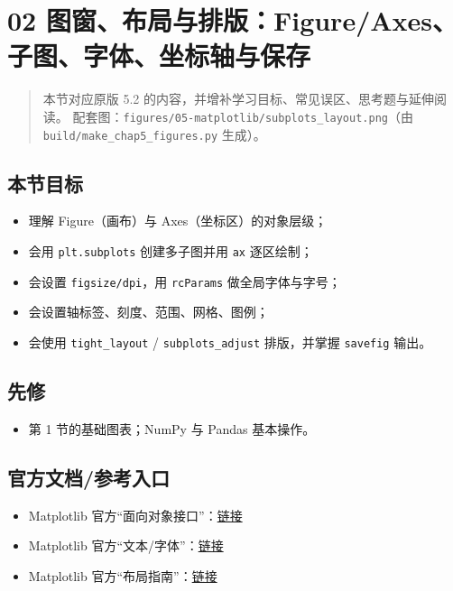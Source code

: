 \section{02
图窗、布局与排版：Figure/Axes、子图、字体、坐标轴与保存}\label{ux56feux7a97ux5e03ux5c40ux4e0eux6392ux7248figureaxesux5b50ux56feux5b57ux4f53ux5750ux6807ux8f74ux4e0eux4fddux5b58}

\begin{quote}
本节对应原版 5.2 的内容，并增补学习目标、常见误区、思考题与延伸阅读。
配套图：\texttt{figures/05-matplotlib/subplots\_layout.png}（由
\texttt{build/make\_chap5\_figures.py} 生成）。
\end{quote}

\subsection{本节目标}\label{ux672cux8282ux76eeux6807-21}

\begin{itemize}
\tightlist
\item
  理解 Figure（画布）与 Axes（坐标区）的对象层级；
\item
  会用 \texttt{plt.subplots} 创建多子图并用 \texttt{ax} 逐区绘制；
\item
  会设置 \texttt{figsize/dpi}，用 \texttt{rcParams} 做全局字体与字号；
\item
  会设置轴标签、刻度、范围、网格、图例；
\item
  会使用 \texttt{tight\_layout} / \texttt{subplots\_adjust} 排版，并掌握
  \texttt{savefig} 输出。
\end{itemize}

\subsection{先修}\label{ux5148ux4fee-14}

\begin{itemize}
\tightlist
\item
  第 1 节的基础图表；NumPy 与 Pandas 基本操作。
\end{itemize}

\subsection{官方文档/参考入口}\label{ux5b98ux65b9ux6587ux6863ux53c2ux8003ux5165ux53e3-3}

\begin{itemize}
\tightlist
\item
  Matplotlib
  官方``面向对象接口''：\href{https://matplotlib.org/stable/tutorials/introductory/usage.html\#the-object-oriented-interface}{链接}
\item
  Matplotlib
  官方``文本/字体''：\href{https://matplotlib.org/stable/users/explain/text/text_props.html}{链接}
\item
  Matplotlib
  官方``布局指南''：\href{https://matplotlib.org/stable/tutorials/intermediate/tight_layout_guide.html}{链接}
\end{itemize}

